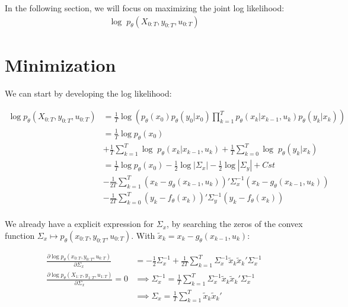 \documentclass[10pt,a4paper]{report}
\begin{document}
In the following section, we will focus on maximizing the joint log likelihood:
\begin{align}
	\log \; p_{\theta}(X_{0:T}, y_{0:T}, u_{0:T})
	\label{log_likelihood}
\end{align}

\section{Minimization}
We can start by developing the log likelihood:

\begin{align*}
	\log p_{\theta}(X_{0:T}, y_{0:T}, u_{0:T}) & = \frac{1}{T} \log\left(p_\theta(x_0)p_\theta(y_0 | x_0)\prod_{k=1}^{T} p_{\theta}(x_k | x_{k-1}, u_k) p_{\theta}(y_k | x_k)\right) \\
						   & = \frac{1}{T} \log p_\theta(x_0)                                                                                                    \\
						   & + \frac{1}{T} \sum_{k=1}^{T} \log \; p_{\theta}(x_k | x_{k-1}, u_k) + \frac{1}{T} \sum_{k=0}^{T} \log \; p_{\theta}(y_k | x_k)      \\
						   & = \frac{1}{T} \log p_\theta(x_0) -\frac{1}{2} \log|\Sigma_x| -\frac{1}{2} \log|\Sigma_y| + Cst                                      \\
						   & - \frac{1}{2T} \sum_{k=1}^{T}(x_k - g_\theta(x_{k-1}, u_{k}))' \Sigma_x^{-1} (x_k - g_\theta(x_{k-1}, u_{k}))                       \\
						   & - \frac{1}{2T} \sum_{k=0}^{T}(y_k - f_\theta(x_k))' \Sigma_y^{-1} (y_k - f_\theta(x_k))                                             \\
\end{align*}

We already have a explicit expression for $\Sigma_x$, by searching the zeros of the convex function $\Sigma_x \mapsto p_\theta(x_{0:T}, y_{0:T}, u_{0:T})$.
With $\tilde x_k = x_k - g_\theta(x_{k-1}, u_k)$:

\begin{align*}
	\frac{\partial \log p_\theta(x_{0:T}, y_{0:T}, u_{0:T})}{\partial \Sigma_x}     & = -\frac{1}{2} \Sigma_x^{-1} + \frac{1}{2T} \sum_{k=1}^T \Sigma_x^{-1}\tilde x_k \tilde x_k'\Sigma_x^{-1} \\
	\frac{\partial \log p_\theta(X_{1:T}, y_{1:T}, u_{1:T})}{\partial \Sigma_x} = 0 & \implies \Sigma_x^{-1} = \frac{1}{T}\sum_{k=1}^T \Sigma_x^{-1}\tilde x_k \tilde x_k'\Sigma_x^{-1}         \\
											& \implies \Sigma_x = \frac{1}{T}\sum_{k=1}^T\tilde x_k \tilde x_k'
\end{align*}
\end{document}
